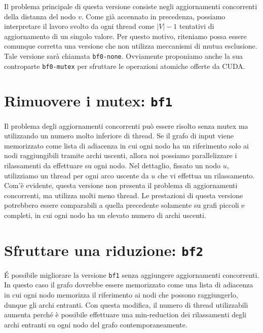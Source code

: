 \documentclass[12pt,a4paper]{book} %
\begin{document}
	Il problema principale di questa versione consiste negli aggiornamenti concorrenti della distanza del nodo $v$. Come già accennato in precedenza, possiamo interpretare il lavoro svolto da ogni thread come $|V|-1$ tentativi di aggiornamento di un singolo valore. Per questo motivo, riteniamo possa essere comunque corretta una versione che non utilizza meccanismi di mutua esclusione. Tale versione sarà chiamata \texttt{bf0-none}. Ovviamente proponiamo anche la sua controparte \texttt{bf0-mutex} per sfruttare le operazioni atomiche offerte da CUDA.
	
	\section{Rimuovere i mutex: \texttt{bf1}}
	Il problema degli aggiornamenti concorrenti può essere risolto senza mutex ma utilizzando un numero molto inferiore di thread. Se il grafo di input viene memorizzato come lista di adiacenza in cui ogni nodo ha un riferimento solo ai nodi raggiungibili tramite archi uscenti, allora noi possiamo parallelizzare i rilassamenti da effettuare su ogni nodo. Nel dettaglio, fissato un nodo $u$, utilizziamo un thread per ogni arco uscente da $u$ che vi effettua un rilassamento. Com'è evidente, questa versione non presenta il problema di aggiornamenti concorrenti, ma utilizza molti meno thread. Le prestazioni di questa versione potrebbero essere comparabili a quella precedente solamente su grafi piccoli e completi, in cui ogni nodo ha un elevato numero di archi uscenti.
	
	\section{Sfruttare una riduzione: \texttt{bf2}}
	\'E possibile migliorare la versione \texttt{bf1} senza aggiungere aggiornamenti concorrenti. In questo caso il grafo dovrebbe essere memorizzato come una lista di adiacenza in cui ogni nodo memorizza il riferimento ai nodi che possono raggiungerlo, dunque gli archi entranti. Con questa modifica, il numero di thread utilizzabili aumenta perché è possibile effettuare una min-reduction dei rilassamenti degli archi entranti su ogni nodo del grafo contemporaneamente.
	
\end{document}

